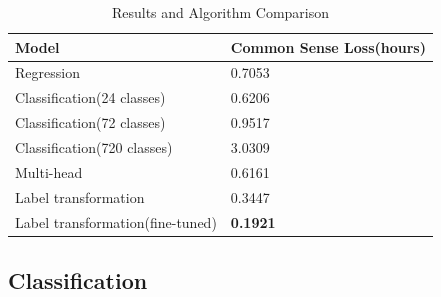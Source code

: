 \documentclass{article}
\begin{document}
    \begin{table}[!ht]
	\caption{Results and Algorithm Comparison}
	\label{tab:performance}
	\centering
	\begin{tabular}{ll}
		\toprule
		\textbf{Model} & \textbf{Common Sense Loss(hours)} \\
		\midrule
		Regression & 0.7053 \\
		Classification(24 classes) & 0.6206 \\
		Classification(72 classes) & 0.9517 \\
		Classification(720 classes) & 3.0309 \\
		Multi-head & 0.6161 \\
		Label transformation & 0.3447 \\
        Label transformation(fine-tuned) & \textbf{0.1921} \\
		\bottomrule
	\end{tabular}
\end{table}

\subsection{Classification}
\end{document}
